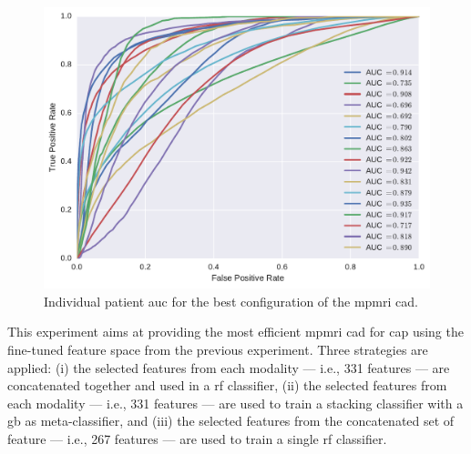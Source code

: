 \begin{figure}
  \centering
  \includegraphics[width=0.7\linewidth]{content/figures/exp-5/plot_all_patients.pdf}
  \caption{Individual patient \acs*{auc} for the best configuration of the \acs*{mpmri} \acs*{cad}.}
  \label{fig:indauc}
\end{figure}

This experiment aims at providing the most efficient \ac{mpmri} \ac{cad} for \ac{cap} using the fine-tuned feature space from the previous experiment.
Three strategies are applied:
(i) the selected features from each modality --- i.e., 331 features --- are concatenated together and used in a \ac{rf} classifier,
(ii) the selected features from each modality --- i.e., 331 features --- are used to train a stacking classifier with a \ac{gb} as meta-classifier, and
(iii) the selected features from the concatenated set of feature --- i.e., 267 features --- are used to train a single \ac{rf} classifier.

